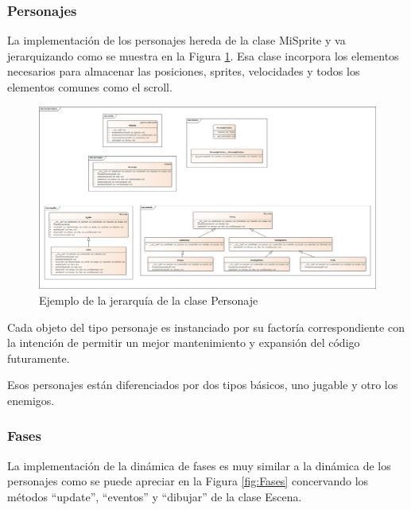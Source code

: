 \subsubsection{Personajes}
La implementación de los personajes hereda de la clase MiSprite y va jerarquizando como se muestra en la Figura \ref{fig:Personaje}. Esa clase incorpora los elementos necesarios para almacenar las posiciones, sprites, velocidades y todos los elementos comunes como el scroll.

\begin{figure}[H]
	\centering
	\includegraphics[scale=0.30]{imagenes/Personaje.png}
	\caption{\label{fig:Personaje}Ejemplo de la jerarquía de la clase Personaje}
\end{figure}

Cada objeto del tipo personaje es instanciado por su factoría correspondiente con la intención de permitir un mejor mantenimiento y expansión del código futuramente.

Esos personajes están diferenciados por dos tipos básicos, uno jugable y otro los enemigos.

\subsubsection{Fases}
La implementación de la dinámica de fases es muy similar a la dinámica de los personajes como se puede apreciar en la Figura \ref{fig:Fases} concervando los métodos ``update'', ``eventos'' y ``dibujar'' de la clase Escena.

